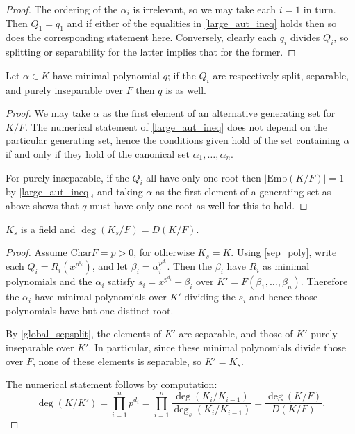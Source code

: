 \begin{proof} The ordering of the $\alpha_i$ is irrelevant, so we may take
each $i = 1$ in turn. Then $Q_1 = q_1$ and if either of the equalities in
\ref{large_aut_ineq} holds then so does the corresponding statement here.
Conversely, clearly each $q_i$ divides $Q_i$, so splitting or separability
for the latter implies that for the former. \end{proof}

\begin{lemma} Let $\alpha \in K$ have minimal polynomial $q$; if the $Q_i$
are
respectively split, separable, and purely inseparable over $F$ then $q$ is as
well.
\label{global_sepsplit}
\end{lemma}

\begin{proof} We may take $\alpha$ as the first element of an alternative
generating set for $K/F$. The numerical statement of \ref{large_aut_ineq}
does not depend on the particular generating set, hence the conditions given
hold of the set containing $\alpha$ if and only if they hold of the canonical
set ${\alpha_1, \dots, \alpha_n}$.

For purely inseparable, if the $Q_i$ all have only one root then $|\text{Emb}(K/F)|
= 1$ by \ref{large_aut_ineq}, and taking $\alpha$ as the first element of a
generating set as above shows that $q$ must have only one root as well for
this to hold. \end{proof}

\begin{lemma} $K_s$ is a field and $\deg(K_s/F) = D(K/F)$.
\label{sep_subfield}
\end{lemma}

\begin{proof} Assume $\text{Char}{F} = p > 0$, for otherwise $K_s = K$. Using
\ref{sep_poly}, write each $Q_i = R_i(x^{p^{d_i}})$, and let $\beta_i =
\alpha_i^{p^{d_i}}$. Then the $\beta_i$ have $R_i$ as minimal polynomials and
the $\alpha_i$ satisfy $s_i = x^{p^{d_i}} - \beta_i$ over $K' = F(\beta_1,
\dots, \beta_n)$. Therefore the $\alpha_i$ have minimal polynomials over $K'$
dividing the $s_i$ and hence those polynomials have but one distinct root.

By \ref{global_sepsplit}, the elements of $K'$ are separable, and those of
$K'$ purely inseparable over $K'$. In particular, since these minimal
polynomials divide those over $F$, none of these elements is separable, so $K'
= K_s$.

The numerical statement follows by computation:
\begin{equation*}
\deg(K/K') = \prod_{i = 1}^n p^{d_i}
	= \prod_{i = 1}^n \frac{\deg(K_i/K_{i - 1})}{\deg_s(K_i/K_{i - 1})}
	= \frac{\deg(K/F)}{D(K/F)}.
	\end{equation*}
\end{proof}

